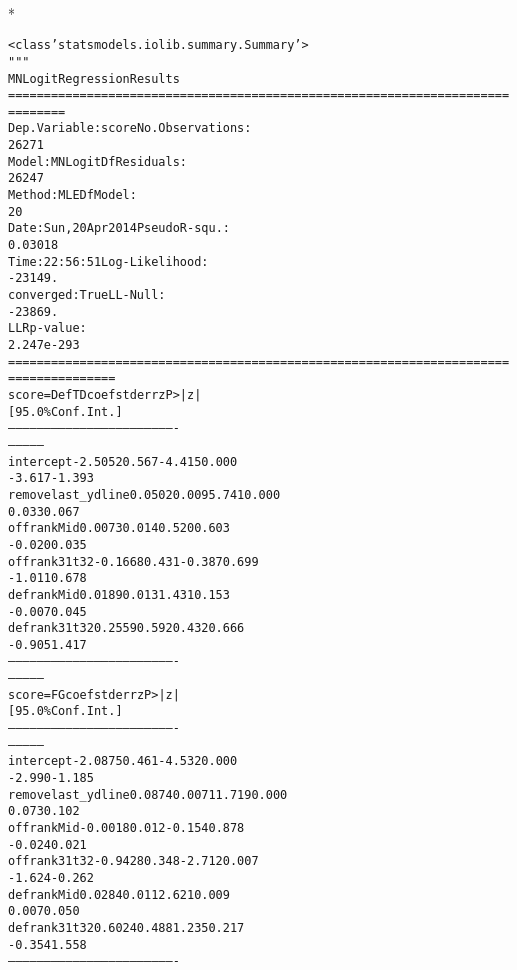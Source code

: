 \documentclass[letterpaper,10pt,english]{/anaconda/lib/python2.7/site-packages/sphinx/texinputs/sphinxhowto}
\def\smaller{\fontsize{9.5pt}{9.5pt}\selectfont}
\newenvironment{InvisibleVerbatim}
        {\begin{mdframed}[leftmargin=0.1\linewidth,innerleftmargin=3pt,innerrightmargin=3pt, userdefinedwidth=1\linewidth, linewidth=0pt, linecolor=white, usetwoside=false]}
        {\end{mdframed}}
\begin{document}
                \makebox[0.1\linewidth]{\smaller\hfill\tt\color{nbframe-out-prompt}Out\hspace{4pt}{[}15{]}:\hspace{4pt}}\\*
                \vspace{-2.55\baselineskip}\begin{InvisibleVerbatim}
                \vspace{-0.5\baselineskip}
\begin{alltt}<class 'statsmodels.iolib.summary.Summary'>
"""
                          MNLogit Regression Results
======================================================================
========
Dep. Variable:                  score   No. Observations:
26271
Model:                        MNLogit   Df Residuals:
26247
Method:                           MLE   Df Model:
20
Date:                Sun, 20 Apr 2014   Pseudo R-squ.:
0.03018
Time:                        22:56:51   Log-Likelihood:
-23149.
converged:                       True   LL-Null:
-23869.
                                        LLR p-value:
2.247e-293
======================================================================
===============
      score=DefTD       coef    std err          z      P>|z|
[95.0\% Conf. Int.]
----------------------------------------------------------------------
---------------
intercept            -2.5052      0.567     -4.415      0.000
-3.617    -1.393
removelast\_ydline     0.0502      0.009      5.741      0.000
0.033     0.067
offrankMid            0.0073      0.014      0.520      0.603
-0.020     0.035
offrank31t32         -0.1668      0.431     -0.387      0.699
-1.011     0.678
defrankMid            0.0189      0.013      1.431      0.153
-0.007     0.045
defrank31t32          0.2559      0.592      0.432      0.666
-0.905     1.417
----------------------------------------------------------------------
---------------
         score=FG       coef    std err          z      P>|z|
[95.0\% Conf. Int.]
----------------------------------------------------------------------
---------------
intercept            -2.0875      0.461     -4.532      0.000
-2.990    -1.185
removelast\_ydline     0.0874      0.007     11.719      0.000
0.073     0.102
offrankMid           -0.0018      0.012     -0.154      0.878
-0.024     0.021
offrank31t32         -0.9428      0.348     -2.712      0.007
-1.624    -0.262
defrankMid            0.0284      0.011      2.621      0.009
0.007     0.050
defrank31t32          0.6024      0.488      1.235      0.217
-0.354     1.558
----------------------------------------------------------------------

\end{alltt}
\end{InvisibleVerbatim}
\end{document}
